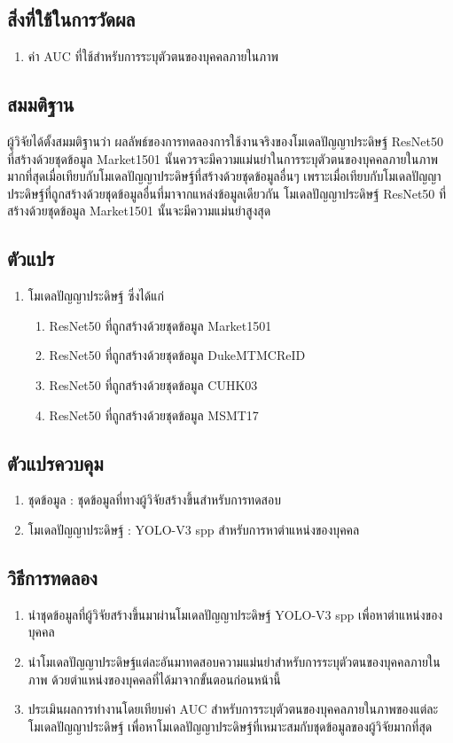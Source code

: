 \subsection*{สิ่งที่ใช้ในการวัดผล}
	\begin{enumerate}
		\setlength\itemsep{-0.25em}
		\item ค่า AUC ที่ใช้สำหรับการระบุตัวตนของบุคคลภายในภาพ
	\end{enumerate}
\subsection*{สมมติฐาน}
ผู้วิจัยได้ตั้งสมมติฐานว่า ผลลัพธ์ของการทดลองการใช้งานจริงของโมเดลปัญญาประดิษฐ์ ResNet50 ที่สร้างด้วยชุดข้อมูล Market1501 
นั้นควรจะมีความแม่นยำในการระบุตัวตนของบุคคลภายในภาพมากที่สุดเมื่อเทียบกับโมเดลปัญญาประดิษฐ์ที่สร้างด้วยชุดข้อมูลอื่นๆ
เพราะเมื่อเทียบกับโมเดลปัญญาประดิษฐ์ที่ถูกสร้างด้วยชุดข้อมูลอื่นที่มาจากแหล่งข้อมูลเดียวกัน โมเดลปัญญาประดิษฐ์ ResNet50 ที่สร้างด้วยชุดข้อมูล Market1501 นั้นจะมีความแม่นยำสูงสุด
\subsection*{ตัวแปร}
	\begin{enumerate}
		\setlength\itemsep{-0.25em}
		\item โมเดลปัญญาประดิษฐ์ ซึ่งได้แก่
		\begin{enumerate}
			\setlength\itemsep{-0.25em}
			\item ResNet50 ที่ถูกสร้างด้วยชุดข้อมูล Market1501
			\item ResNet50 ที่ถูกสร้างด้วยชุดข้อมูล DukeMTMCReID
			\item ResNet50 ที่ถูกสร้างด้วยชุดข้อมูล CUHK03	
			\item ResNet50 ที่ถูกสร้างด้วยชุดข้อมูล MSMT17
		\end{enumerate}
	\end{enumerate}
\subsection*{ตัวแปรควบคุม}
	\begin{enumerate}
		\setlength\itemsep{-0.25em}
		\item ชุดข้อมูล : ชุดข้อมูลที่ทางผู้วิจัยสร้างขึ้นสำหรับการทดสอบ
		\item โมเดลปัญญาประดิษฐ์ : YOLO-V3 spp  สำหรับการหาตำแหน่งของบุคคล
	\end{enumerate}
\subsection*{วิธีการทดลอง}
	\begin{enumerate}
		\setlength\itemsep{-0.25em}
		\item นำชุดข้อมูลที่ผู้วิจัยสร้างขึ้นมาผ่านโมเดลปัญญาประดิษฐ์ YOLO-V3 spp เพื่อหาตำแหน่งของบุคคล
		\item นำโมเดลปัญญาประดิษฐ์แต่ละอันมาทดสอบความแม่นยำสำหรับการระบุตัวตนของบุคคลภายในภาพ ด้วยตำแหน่งของบุคคลที่ได้มาจากขั้นตอนก่อนหน้านี้
		\item ประเมินผลการทำงานโดยเทียบค่า AUC สำหรับการระบุตัวตนของบุคคลภายในภาพของแต่ละโมเดลปัญญาประดิษฐ์ เพื่อหาโมเดลปัญญาประดิษฐ์ที่เหมาะสมกับชุดข้อมูลของผู้วิจัยมากที่สุด
\end{enumerate}
